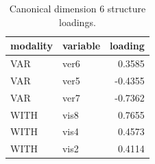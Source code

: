 \begin{table}
\caption{Canonical dimension 6 structure loadings.}
\label{tab:cca_dimension_6_loadings}
\begin{tabular}{llr}
\toprule
modality & variable & loading \\
\midrule
VAR & ver6 & 0.3585 \\
VAR & ver5 & -0.4355 \\
VAR & ver7 & -0.7362 \\
WITH & vis8 & 0.7655 \\
WITH & vis4 & 0.4573 \\
WITH & vis2 & 0.4114 \\
\bottomrule
\end{tabular}
\end{table}
